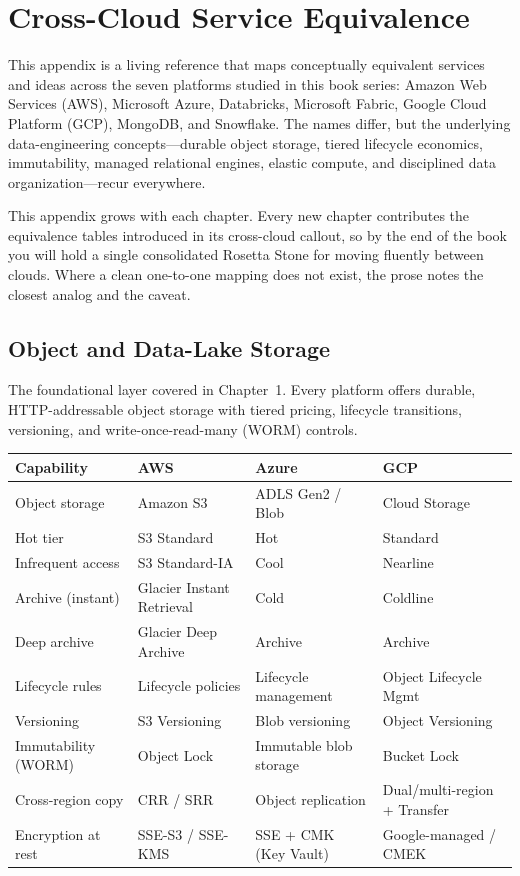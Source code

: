 \chapter{Cross-Cloud Service Equivalence}
%
This appendix is a living reference that maps conceptually equivalent services and
ideas across the seven platforms studied in this book series: Amazon Web Services
(AWS), Microsoft Azure, Databricks, Microsoft Fabric, Google Cloud Platform (GCP),
MongoDB, and Snowflake. The names differ, but the underlying data-engineering
concepts---durable object storage, tiered lifecycle economics, immutability, managed
relational engines, elastic compute, and disciplined data organization---recur
everywhere.

\begin{notebox}
This appendix grows with each chapter. Every new chapter contributes the equivalence
tables introduced in its cross-cloud callout, so by the end of the book you will hold
a single consolidated Rosetta Stone for moving fluently between clouds. Where a clean
one-to-one mapping does not exist, the prose notes the closest analog and the caveat.
\end{notebox}

\section{Object and Data-Lake Storage}
%
The foundational layer covered in Chapter~1. Every platform offers durable, HTTP-addressable
object storage with tiered pricing, lifecycle transitions, versioning, and write-once-read-many
(WORM) controls.

\begin{center}
\footnotesize
\begin{tabular}{@{}p{2.8cm}p{3.2cm}p{3.2cm}p{3.2cm}@{}}
\toprule
\textbf{Capability} & \textbf{AWS} & \textbf{Azure} & \textbf{GCP} \\
\midrule
Object storage & Amazon S3 & ADLS Gen2 / Blob & Cloud Storage \\
Hot tier & S3 Standard & Hot & Standard \\
Infrequent access & S3 Standard-IA & Cool & Nearline \\
Archive (instant) & Glacier Instant Retrieval & Cold & Coldline \\
Deep archive & Glacier Deep Archive & Archive & Archive \\
Lifecycle rules & Lifecycle policies & Lifecycle management & Object Lifecycle Mgmt \\
Versioning & S3 Versioning & Blob versioning & Object Versioning \\
Immutability (WORM) & Object Lock & Immutable blob storage & Bucket Lock \\
Cross-region copy & CRR / SRR & Object replication & Dual/multi-region + Transfer \\
Encryption at rest & SSE-S3 / SSE-KMS & SSE + CMK (Key Vault) & Google-managed / CMEK \\
\bottomrule
\end{tabular}
\end{center}


